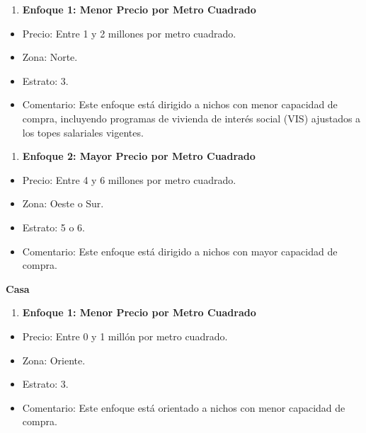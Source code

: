 \documentclass[conference,final,]{IEEEtran}
\providecommand{\tightlist}{%
  \setlength{\itemsep}{0pt}\setlength{\parskip}{0pt}}
\begin{document}
\begin{enumerate}
\def\labelenumi{\arabic{enumi}.}
\tightlist
\item
  \textbf{Enfoque 1: Menor Precio por Metro Cuadrado}
\end{enumerate}

\begin{itemize}
\tightlist
\item
  Precio: Entre 1 y 2 millones por metro cuadrado.
\item
  Zona: Norte.
\item
  Estrato: 3.
\item
  Comentario: Este enfoque está dirigido a nichos con menor capacidad de
  compra, incluyendo programas de vivienda de interés social (VIS)
  ajustados a los topes salariales vigentes.
\end{itemize}

\begin{enumerate}
\def\labelenumi{\arabic{enumi}.}
\setcounter{enumi}{1}
\tightlist
\item
  \textbf{Enfoque 2: Mayor Precio por Metro Cuadrado}
\end{enumerate}

\begin{itemize}
\tightlist
\item
  Precio: Entre 4 y 6 millones por metro cuadrado.
\item
  Zona: Oeste o Sur.
\item
  Estrato: 5 o 6.
\item
  Comentario: Este enfoque está dirigido a nichos con mayor capacidad de
  compra.
\end{itemize}

\textbf{Casa}

\begin{enumerate}
\def\labelenumi{\arabic{enumi}.}
\tightlist
\item
  \textbf{Enfoque 1: Menor Precio por Metro Cuadrado}
\end{enumerate}

\begin{itemize}
\tightlist
\item
  Precio: Entre 0 y 1 millón por metro cuadrado.
\item
  Zona: Oriente.
\item
  Estrato: 3.
\item
  Comentario: Este enfoque está orientado a nichos con menor capacidad
  de compra.
\end{itemize}
\end{document}
